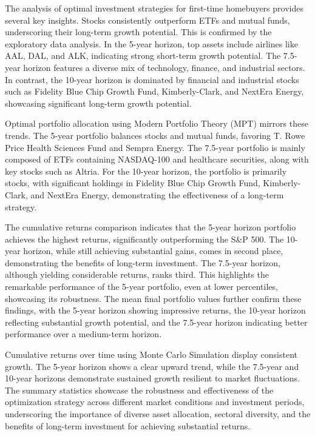 The analysis of optimal investment strategies for first-time homebuyers provides several key insights. Stocks consistently outperform ETFs and mutual funds, underscoring their long-term growth potential. This is confirmed by the exploratory data analysis. In the 5-year horizon, top assets include airlines like AAL, DAL, and ALK, indicating strong short-term growth potential. The 7.5-year horizon features a diverse mix of technology, finance, and industrial sectors. In contrast, the 10-year horizon is dominated by financial and industrial stocks such as Fidelity Blue Chip Growth Fund, Kimberly-Clark, and NextEra Energy, showcasing significant long-term growth potential.

Optimal portfolio allocation using Modern Portfolio Theory (MPT) mirrors these trends. The 5-year portfolio balances stocks and mutual funds, favoring T. Rowe Price Health Sciences Fund and Sempra Energy. The 7.5-year portfolio is mainly composed of ETFs containing NASDAQ-100 and healthcare securities, along with key stocks such as Altria. For the 10-year horizon, the portfolio is primarily stocks, with significant holdings in Fidelity Blue Chip Growth Fund, Kimberly-Clark, and NextEra Energy, demonstrating the effectiveness of a long-term strategy.

The cumulative returns comparison indicates that the 5-year horizon portfolio achieves the highest returns, significantly outperforming the S\&P 500. The 10-year horizon, while still achieving substantial gains, comes in second place, demonstrating the benefits of long-term investment. The 7.5-year horizon, although yielding considerable returns, ranks third. This highlights the remarkable performance of the 5-year portfolio, even at lower percentiles, showcasing its robustness. The mean final portfolio values further confirm these findings, with the 5-year horizon showing impressive returns, the 10-year horizon reflecting substantial growth potential, and the 7.5-year horizon indicating better performance over a medium-term horizon.

Cumulative returns over time using Monte Carlo Simulation display consistent growth. The 5-year horizon shows a clear upward trend, while the 7.5-year and 10-year horizons demonstrate sustained growth resilient to market fluctuations. The summary statistics showcase the robustness and effectiveness of the optimization strategy across different market conditions and investment periods, underscoring the importance of diverse asset allocation, sectoral diversity, and the benefits of long-term investment for achieving substantial returns.


\newpage
